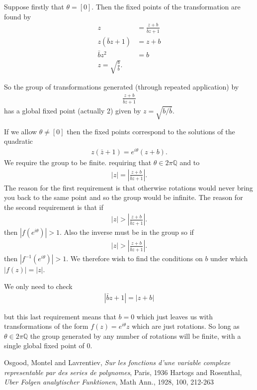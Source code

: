 \documentclass{unswmaths}
\begin{document}
Suppose firstly that $ \theta = [0] $. Then the fixed points of the transformation are found by
\begin{align}
	z 	&= \frac{z + b}{\bar{b}z + 1} \\
	z(\bar{b}z + 1) &= z + b \\
	\bar{b}z^2 &= b \\
	z = \sqrt{\frac{b}{\bar{b}}}.
\end{align}

So the group of transformations generated (through repeated application) by
\begin{align}
	\frac{z+b}{\bar{b}{z} + 1}
\end{align}
has a global fixed point (actually 2) given by $ z = \sqrt{ b / \bar{b}} $.

If we allow $ \theta \neq [0] $ then the fixed points correspond to the solutions of the quadratic
\begin{align}
	z(\bar{z} + 1) = e^{i\theta}(z+ b).
\end{align}
We require the group to be finite. 
requiring that $ \theta \in 2\pi \mathbb{Q} $ and to
\begin{align}
	|z| = \left| \frac{z+b}{\bar{b}z + 1} \right|.
\end{align}
The reason for the first requirement is that otherwise rotations would never bring you back to the same point and so the group would be infinite. The reason for the second requirement is that if
\begin{align}
	|z| > \left| \frac{z+b}{\bar{b}z + 1} \right|.
\end{align}
then $ |f(e^{i\theta})| > 1 $. Also the inverse must be in the group so if 
\begin{align}
	|z| > \left| \frac{z+b}{\bar{b}z + 1} \right|.
\end{align}
then $ |f^{-1}(e^{i\theta})| > 1 $.
We therefore wish to find the conditions on $ b $ under which $ |f(z)| = |z| $. 

We only need to check
\begin{align}
	|\bar{b}z + 1| = |z + b|
\end{align}

but this last requirement means that $ b = 0 $ which just leaves us with transformations of the form
$ f(z) = e^{i \theta} z $ which are just rotations. So long as $ \theta \in 2\pi\mathbb{Q} $ the group generated by any number of rotations will be finite, with a single global fixed point of 0.

\begin{thebibliography}{9}

	Osgood, Montel and Lavrentiev,
	\emph{Sur les fonctions d'une variable complexe representable par des series de polynomes},
	Paris,
	1936
	Hartogs and Rosenthal,
	\emph{Uber Folgen analytischer Funktionen},
	Math Ann.,
	1928,
	100,
	212-263
\end{thebibliography}
\end{document}
